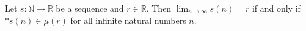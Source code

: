 Let $s: \mathbb{N} \to \mathbb{R}$ be a sequence and $r \in \mathbb{R}$. Then $\lim_{n \to \infty} s(n) = r$ if and only if $*s(n) \in \mu(r)$ for all infinite natural numbers $n$.

